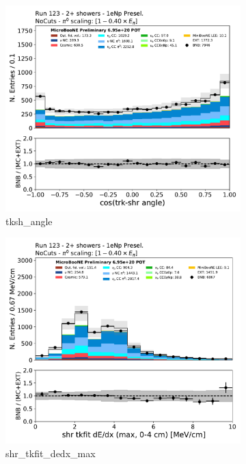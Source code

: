\begin{figure}[H]
\begin{subfigure}{0.3\textwidth}
    \includegraphics[width=1.0\textwidth]{Sidebands/Figures/1eNp/TwoShower/TwoPShr_NP_None_pi0e040/tksh_angle.pdf}
    \caption{tksh\_angle}
    \end{subfigure}
    \begin{subfigure}{0.3\textwidth}
    \includegraphics[width=1.0\textwidth]{Sidebands/Figures/1eNp/TwoShower/TwoPShr_NP_None_pi0e040/shr_tkfit_dedx_max.pdf}
    \caption{shr\_tkfit\_dedx\_max}
    \end{subfigure}
    \caption{} 
    \label{fig:TWOP_1eNp_1}
\end{figure}

